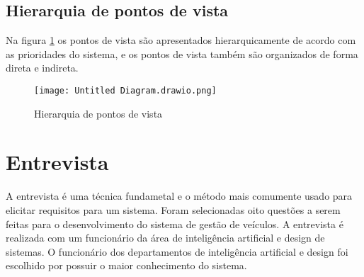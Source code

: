 \subsection{ Hierarquia de pontos de vista}
Na figura \ref{vista} os pontos de vista são apresentados hierarquicamente de acordo com as prioridades do sistema, e os pontos de vista também são organizados de forma direta e indireta.
\begin{figure}[H]
      \begin{center}
            \caption{Hierarquia de pontos de vista} \label{vista}
            \texttt{[image: Untitled Diagram.drawio.png]} \\

      \end{center}
\end{figure}

\section{Entrevista}



A entrevista é uma técnica fundametal e o método mais comumente usado para elicitar requisitos para um sistema. Foram selecionadas oito questões a serem feitas para o desenvolvimento do sistema de gestão de veículos. A entrevista é realizada com um funcionário da área de inteligência artificial e design de sistemas. O funcionário dos departamentos de inteligência artificial e design foi escolhido por possuir o maior conhecimento do sistema.  \\

